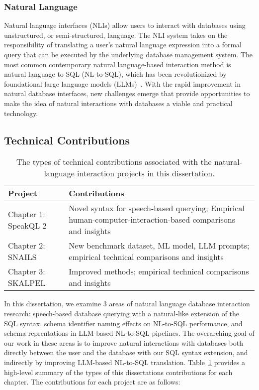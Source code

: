 \subsubsection{Natural Language}

Natural language interfaces (NLIs) allow users to interact with databases using unstructured, or semi-structured, language. 
The NLI system takes on the responsibility of translating a user's natural language expression into a formal query that can be executed by the underlying database management system.
The most common contemporary natural language-based interaction method is natural language to SQL (NL-to-SQL), which has been revolutionized by foundational large language models (LLMs)~\cite{openai-chatgpt-blog-post, roziere2023code, anil2023palm}.
With the rapid improvement in natural database interfaces, new challenges emerge that provide opportunities to make the idea of natural interactions with databases a viable and practical technology.


\subsection{Technical Contributions}

\begin{table}[th]
    \centering
    \caption{The types of technical contributions associated with the natural-language interaction projects in this dissertation.}
    \begin{tabular}{p{4cm}p{9cm}}
    \toprule
    \textbf{Project} & \textbf{Contributions} \\
    \midrule
    Chapter 1: SpeakQL 2 & Novel syntax for speech-based querying; Empirical human-computer-interaction-based comparisons and insights\\
    Chapter 2: SNAILS & New benchmark dataset, ML model, LLM prompts; empirical technical comparisons and insights \\
    Chapter 3: SKALPEL & Improved methods; empirical technical comparisons and insights \\
    \bottomrule
    \end{tabular}
    \label{table:contributions}
\end{table}

In this dissertation, we examine 3 areas of natural language database interaction research: speech-based database querying with a natural-like extension of the SQL syntax, schema identifier naming effects on NL-to-SQL performance, and schema reprentations in LLM-based NL-to-SQL pipelines.
The overarching goal of our work in these areas is to improve natural interactions with databases both directly between the user and the database with our SQL syntax extension, and indirectly by improving LLM-based NL-to-SQL translation.
Table~\ref{table:contributions} provides a high-level summary of the types of this dissertations contributions for each chapter.
The contributions for each project are as follows:

